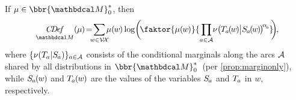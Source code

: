 \documentclass[twoside]{article}
\begin{document}
\begin{prop}\label{prop:idef-frozen}
If $\mu \in \bbr{\dg M}_0^*$,
then
\vspace{-1ex}
\begin{equation}
    \underset{{\dg M}}{\CDef_{}}(\mskip-0.5mu\mu\mskip-1mu) \!=\!
        \sum_{\mathclap{ w \in \V\!\X } }
            \mskip-1mu
            \mu(\mskip-1.5mu w \mskip-1.5mu)
            \log \!  \bigg(\!
                \faktor{\mu(\mskip-1.5mu w\mskip-1.5mu )}{\,\prod_{\mathclap{a \in \Ar}} 
                \mskip-1mu
                \nu\big(\mskip-1mu\Tgt a \mskip-2.2mu(\mskip-2mu w \mskip-2mu) 
                    \mskip-0.5mu \big|  \Src a \mskip-2mu(\mskip-2mu w \mskip-2mu)\mskip-2mu\big)^
                {\!\alpha\ssub a}
                }\!\mskip-2mu
            \bigg)\mskip-2mu
        ,\!
        \label{eq:idef-alt-constr}
\end{equation}
%
where $\{ \nu(\Tgt a | \Src a ) \}_{a \in \Ar}$ consists of the
conditional marginals along the arcs $\mathcal A$
shared by all distributions in $\bbr{\dg M}^*_0$\
(per \cref{prop:marginonly}),
while $\Src a \mskip-1mu(\mskip-1mu w \mskip-1mu)$ and $\Tgt a \mskip-1mu(\mskip-1mu w \mskip-1mu)$ are the
values of the variables $\Src a$ and $\Tgt a$
in $w$,
respectively.
\end{prop}
\end{document}
